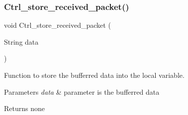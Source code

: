 \subsubsection{\texorpdfstring{Ctrl\+\_\+store\+\_\+received\+\_\+packet()}{Ctrl\_store\_received\_packet()}}
{\footnotesize\ttfamily void Ctrl\+\_\+store\+\_\+received\+\_\+packet (\begin{DoxyParamCaption}\item[{String}]{data }\end{DoxyParamCaption})}



Function to store the bufferred data into the local variable. 


\begin{DoxyParams}{Parameters}
{\em data} & parameter is the bufferred data\\
\hline
\end{DoxyParams}
\begin{DoxyReturn}{Returns}
none 
\end{DoxyReturn}
